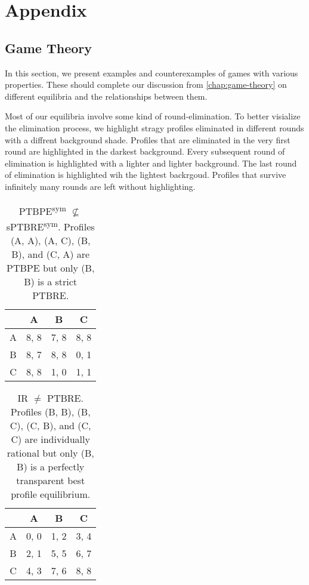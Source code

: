 \chapter{Appendix}

\section{Game Theory}
In this section, we present examples and counterexamples of games with various properties.
These should complete our discussion from \autoref{chap:game-theory} on different equilibria and the relationships between them.

Most of our equilibria involve some kind of round-elimination.
To better visialize the elimination process, we highlight stragy profiles eliminated in different rounds with a diffrent background shade.
Profiles that are eliminated in the very first round are highlighted in the \colorbox{gray!80}{darkest} background.
Every subsequent round of elimination is highlighted with a \colorbox{gray!60}{lighter} and \colorbox{gray!40}{lighter} background.
The last round of elimination is highlighted wih the \colorbox{gray!20}{lightest} backrgoud.
Profiles that survive infinitely many rounds are left without highlighting.

\begin{table}
	\caption{
		PTBPE\textsuperscript{sym} $\not\subseteq$ sPTBRE\textsuperscript{sym}.
		Profiles (A, A), (A, C), (B, B), and (C, A) are PTBPE but only (B, B) is a strict PTBRE.
	}
	\label{tab:ptbpe-not-sub-sptbre}
	\centering
	\begin{tabular}{|c|c|c|c|}
		\hline
			& A		& B	   & C	  \\
		\hline
		A 		&\cellcolor{gray!00} 8, 8 &\cellcolor{gray!20} 7, 8 &\cellcolor{gray!00} 8, 8 \\
		\hline
		B		&\cellcolor{gray!20} 8, 7 &\cellcolor{gray!00} 8, 8 &\cellcolor{gray!70} 0, 1 \\
		\hline
		C		&\cellcolor{gray!00} 8, 8 &\cellcolor{gray!70} 1, 0 &\cellcolor{gray!70} 1, 1 \\
		\hline
	\end{tabular}
\end{table}

\begin{table}
	\caption{
		IR $\ne$ PTBRE.
		Profiles (B, B), (B, C), (C, B), and (C, C) are individually rational but only (B, B) is a perfectly transparent best profile equilibrium.
	}
	\label{tab:ir-ne-ptbre}
	\centering
	\begin{tabular}{|c|c|c|c|}
		\hline
			& A		& B	   & C	  \\
		\hline
		A 		&\cellcolor{gray!70} 0, 0 &\cellcolor{gray!70} 1, 2 &\cellcolor{gray!70} 3, 4 \\
		\hline
		B		&\cellcolor{gray!70} 2, 1 &\cellcolor{gray!20} 5, 5 &\cellcolor{gray!20} 6, 7 \\
		\hline
		C		&\cellcolor{gray!70} 4, 3 &\cellcolor{gray!20} 7, 6 &\cellcolor{gray!00} 8, 8 \\
		\hline
	\end{tabular}
\end{table}

